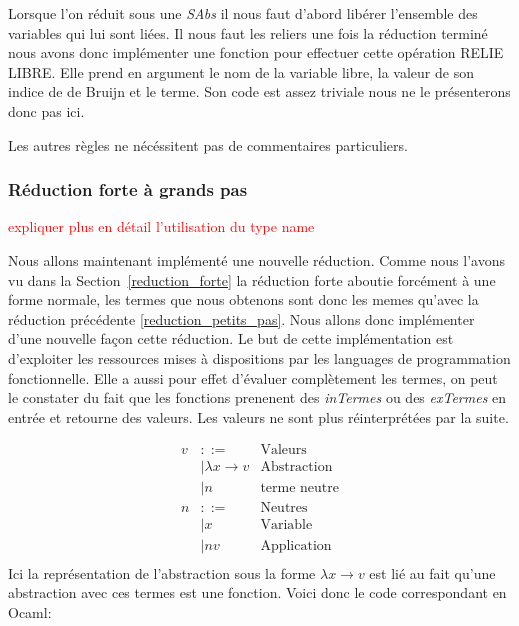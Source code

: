 \documentclass {article}
\theoremstyle{definition}
\theoremstyle{remark}
\newcommand{\todo}[1]{\textcolor{red}{#1}}
\begin{document}
Lorsque l'on réduit sous une \emph{SAbs} il nous faut d'abord libérer l'ensemble des
variables qui lui sont liées. Il nous faut les reliers une fois la réduction terminé 
nous avons donc implémenter une fonction pour effectuer cette opération RELIE LIBRE. %
Elle prend en argument le nom de la variable libre, la valeur de son indice de de Bruijn 
et le terme. Son code est assez triviale nous ne le présenterons donc pas ici.

Les autres règles ne nécéssitent pas de commentaires particuliers.

\subsubsection{Réduction forte à grands pas}

\todo{expliquer plus en détail l'utilisation du type name}


Nous allons maintenant implémenté une nouvelle réduction. 
Comme nous l'avons vu dans la Section~\ref{reduction_forte} %
la réduction forte aboutie forcément à une forme normale, les termes que nous obtenons
sont donc les memes qu'avec la réduction précédente \ref{reduction_petits_pas}. Nous allons donc implémenter 
d'une nouvelle façon cette réduction. Le but de cette implémentation est d'exploiter 
les ressources mises à dispositions par les languages de programmation fonctionnelle.
Elle a aussi pour effet d'évaluer complètement les termes, on peut le constater du fait %
que les fonctions prenenent des \emph{inTermes} ou des \emph{exTermes} en entrée et retourne des valeurs.
Les valeurs ne sont plus réinterprétées par la suite.

\begin{align*}
  v &::= &\mbox{Valeurs} \\
  &| \lambda x \rightarrow v &\mbox{Abstraction} \\
  &| n &\mbox{terme neutre} \\
  n &::= &\mbox{Neutres} \\
  &|x &\mbox{Variable} \\
  &|n v &\mbox{Application} \\
\end{align*}
Ici la représentation de l'abstraction sous la forme \(\lambda x\rightarrow v\)
est lié au fait qu'une abstraction avec ces termes est une fonction.
Voici donc le code correspondant en Ocaml:
\end{document}
